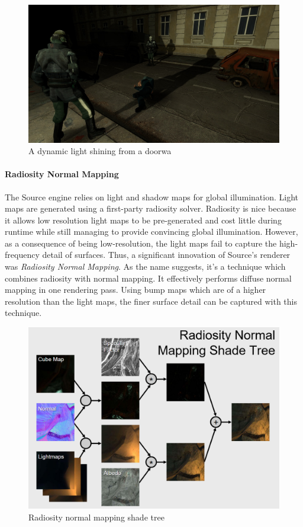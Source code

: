 \documentclass[a4paper, 12pt]{scrartcl}
\begin{document}
\begin{figure}[!ht]
  \centering
  \includegraphics[width=0.66\linewidth]{images/source_env_projectedtexture.jpg}
  \caption{A dynamic light shining from a doorwa}
  \label{fig:source_dynamic_light}
\end{figure}

\paragraph{Radiosity Normal Mapping}
The Source engine relies on light and shadow maps for global illumination. Light maps are generated using a first-party radiosity solver. Radiosity is nice because it allows low resolution light maps to be pre-generated and cost little during runtime while still managing to provide convincing global illumination. However, as a consequence of being low-resolution, the light maps fail to capture the high-frequency detail of surfaces. Thus, a significant innovation of Source's renderer was \textit{Radiosity Normal Mapping}. As the name suggests, it's a technique which combines radiosity with normal mapping. It effectively performs diffuse normal mapping in one rendering pass. Using bump maps which are of a higher resolution than the light maps, the finer surface detail can be captured with this technique.

\begin{figure}[!ht]
  \centering
  \includegraphics[width=0.66\linewidth]{images/source_radiosity_normal_mapping_shade_tree.png}
  \caption{Radiosity normal mapping shade tree}
  \label{fig:source_rad_tree}
\end{figure}
\end{document}
